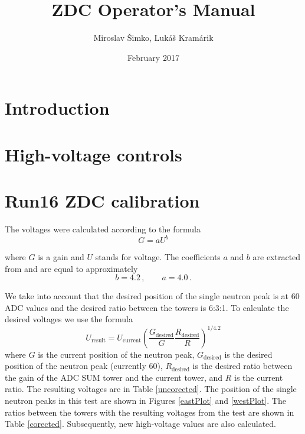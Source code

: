 \documentclass[a4paper,10pt]{report}
\title{ZDC Operator's Manual}
\author{Miroslav Šimko, Lukáš Kramárik}
\date{February 2017}
\begin{document}
\maketitle

\tableofcontents
\chapter{Introduction}

\chapter{High-voltage controls}


\chapter{Run16 ZDC calibration\label{calibration}}



The voltages were calculated according to the formula
\begin{equation}
 G = aU^b
\end{equation}

where $G$ is a gain and $U$ stands for voltage. The coefficients $a$ and $b$ are 
extracted from \cite{ZDCvoltsDependence}
and are equal to approximately
\begin{equation}
b=4.2\,, \qquad a=4.0\,.
\end{equation}

We take into account that the desired position of the single neutron peak is at 60 ADC values
and the desired ratio between the towers is 6:3:1. To calculate the desired voltages we use the
formula
\begin{equation}
U_{\text{result}} = U_\text{current}\left(\frac{G_\text{desired}}{G} 
\frac{R_\text{desired}}{R}\right)^{1/4.2}
\end{equation}
where $G$ is the current position of the neutron peak, $G_\text{desired}$ is the desired position
of the neutron peak (currently 60), $R_\text{desired}$ is the desired ratio between the gain of the ADC SUM
tower and the current tower, and $R$ is the current ratio.
The resulting voltages are in Table \ref{uncorected}. The position of the single
neutron peaks in this test
are shown in Figures \ref{eastPlot} and \ref{westPlot}.
The ratios between the towers with the resulting voltages from the test
are shown in Table \ref{corected}.
Subsequently, new high-voltage values are also calculated.
\end{document}
